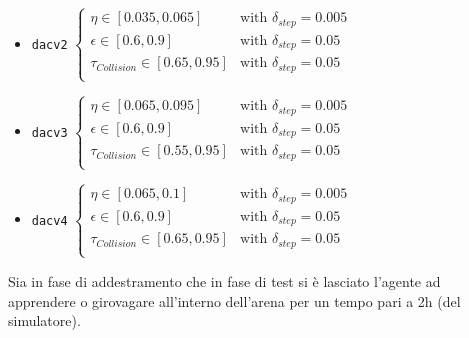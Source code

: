 \begin{itemize}
    \item \texttt{dacv2} $\begin{cases}
            \eta \in [0.035, 0.065] & \text{with $\delta_{step}=0.005$}\\
            \epsilon \in [0.6, 0.9] & \text{with $\delta_{step}=0.05$}\\
            \tau_{Collision} \in [0.65, 0.95] & \text{with $\delta_{step}=0.05$}\\
    \end{cases}$
  
    \item \texttt{dacv3} $\begin{cases}
            \eta \in [0.065, 0.095] & \text{with $\delta_{step}=0.005$}\\
            \epsilon \in [0.6, 0.9] & \text{with $\delta_{step}=0.05$}\\
            \tau_{Collision} \in [0.55, 0.95] & \text{with $\delta_{step}=0.05$}\\
    \end{cases}$
    
    \item \texttt{dacv4} $\begin{cases}
            \eta \in [0.065, 0.1] & \text{with $\delta_{step}=0.005$}\\
            \epsilon \in [0.6, 0.9] & \text{with $\delta_{step}=0.05$}\\
            \tau_{Collision} \in [0.65, 0.95] & \text{with $\delta_{step}=0.05$}\\
    \end{cases}$
\end{itemize}
\hfill\break

Sia in fase di addestramento che in fase di test si è lasciato l'agente ad apprendere o girovagare all'interno dell'arena per un tempo pari a 2h (del simulatore).

